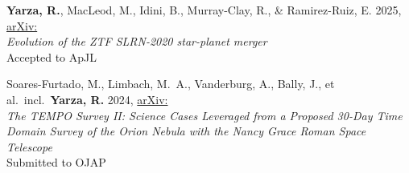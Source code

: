 \item \textbf{Yarza, R.}, MacLeod, M., Idini, B., Murray-Clay, R., \& Ramirez-Ruiz, E. 2025, \href{https://ui.adsabs.harvard.edu/abs/2025arXiv250705365Y}{arXiv:}\\\textit{Evolution of the ZTF SLRN-2020 star-planet merger}\\Accepted to ApJL

\item Soares-Furtado, M., Limbach, M.~A., Vanderburg, A., Bally, J., et al.\ incl.\ \textbf{Yarza, R.} 2024, \href{https://ui.adsabs.harvard.edu/abs/2024arXiv240601492S}{arXiv:}\\\textit{The TEMPO Survey II\@: Science Cases Leveraged from a Proposed 30-Day Time Domain Survey of the Orion Nebula with the Nancy Grace Roman Space Telescope}\\Submitted to OJAP
